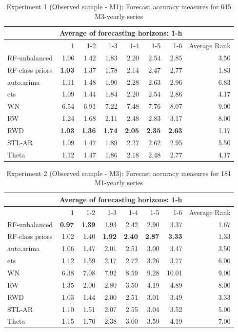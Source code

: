 \documentclass[11pt,a4paper,]{article}
\theoremstyle{definition}
\theoremstyle{definition}
\theoremstyle{definition}
\theoremstyle{remark}
\begin{document}
\begin{table}[!h]
\centering
\caption{Experiment 1 (Observed sample - M1): Forecast accuracy measures for 645 M3-yearly series}
\label{YM3}
\begin{tabular}{lrrrrrrr}
\hline
 & \multicolumn{6}{c}{Average of forecasting horizons: 1-h} \\ \hline
 & 1  & 1-2  & 1-3  & 1-4 & 1-5 & 1-6 & Average Rank \\ \hline
 RF-unbalanced & 1.06  &  1.42 & 1.83  & 2.20 & 2.54 & 2.85 & 3.50 \\ 
 RF-class priors& \bf{1.03}  & 1.37  & 1.78  & 2.14 & 2.47 & 2.77 & 1.83 \\ 
auto.arima &  1.11 & 1.48  & 1.90  & 2.28 & 2.63 & 2.96 & 6.83 \\ 
ets&   1.09  & 1.44  & 1.84 & 2.20 & 2.54 & 2.86 & 4.17\\ 
WN&    6.54  & 6.91  & 7.22 & 7.48 &7.76  & 8.07 & 9.00\\ 
RW &    1.24  & 1.68  & 2.11 & 2.48 & 2.83 & 3.17 &8.00 \\ 
RWD&   \bf{1.03}  & \bf{1.36}  & \bf{1.74} & \bf{2.05} & \bf{2.35} & \bf{2.63} &1.17 \\ 
STL-AR & 1.09  &  1.47 &  1.89 & 2.27 & 2.62 & 2.95 & 5.50 \\ 
Theta & 1.12  & 1.47  & 1.86  & 2.18 & 2.48 & 2.77 & 4.17 \\ \hline
\end{tabular}
\end{table}

\begin{table}[!h]
\centering
\caption{Experiment 2 (Observed sample - M3): Forecast accuracy measures for 181 M1-yearly series}
\label{YM1}
\begin{tabular}{lrrrrrrr}
\hline
 & \multicolumn{6}{c}{Average of forecasting horizons: 1-h} \\ \hline
 & 1  & 1-2  & 1-3  & 1-4 & 1-5 & 1-6 & Average Rank \\ \hline
 RF-unbalanced & \bf{0.97}  & \bf{1.39}  & 1.93  & 2.42 & 2.90 & 3.37 & 1.67 \\ 
 RF-class priors& 1.02  & 1.40 &  \bf{1.92} & \bf{2.40} & \bf{2.87}  & \bf{3.33} &1.33  \\ 
auto.arima &  1.06 & 1.47  & 2.01  & 2.51 & 3.00 & 3.47 & 3.50 \\ 
ets&   1.12  & 1.59  & 2.17 & 2.72 & 3.26 &3.77  & 6.00\\ 
WN&    6.38  & 7.08  & 7.92 & 8.59 & 9.28 & 10.01 & 9.00\\ 
RW &    1.35  & 2.00  & 2.80 & 3.50 & 4.19 & 4.89 & 8.00\\ 
RWD&    1.03  & 1.44  & 2.00 & 2.51 & 3.01 & 3.49 & 3.33 \\ 
STL-AR & 1.10 &  1.51 &  2.07 & 2.55 & 3.04 & 3.52 & 5.00 \\ 
Theta & 1.15  & 1.70  & 2.38  & 3.00 & 3.59 & 4.19 & 7.00 \\ \hline
\end{tabular}
\end{table}
\end{document}
